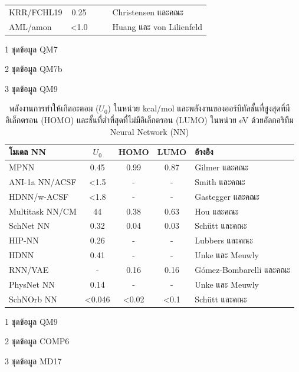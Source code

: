 \begin{table}[H]
\begin{threeparttable}[b]
\begin{tabular}{lcccl}
    KRR/FCHL19\tnote{3} &0.25 & & &Christensen และคณะ\autocite{christensen2020} \\
    AML/amon\tnote{3} &<1.0 & & &Huang และ von Lilienfeld\autocite{huang2020} \\
    \bottomrule
    \end{tabular}
    \begin{tablenotes}
        \item [1]ชุดข้อมูล QM7
        \item [2]ชุดข้อมูล QM7b
        \item [3]ชุดข้อมูล QM9
      \end{tablenotes}
    \end{threeparttable}
\end{table}

\begin{table}[H]
    \begin{threeparttable}[b]
    \centering
    \caption{พลังงานการทำให้เกิดอะตอม ($U_{0}$) ในหน่วย kcal/mol และพลังงานของออร์บิทัลชั้นที่สูงสุดที่มีอิเล็กตรอน (HOMO) 
    และชั้นที่ต่ำที่สุดที่ไม่มีอิเล็กตรอน (LUMO) ในหน่วย eV ด้วยอัลกอริทึม Neural Network (NN)}
    \label{tab:pred_ener_atom_orb_nn}
    \begin{tabular}{lcccl}
    \toprule
    \textbf{โมเดล NN} &\textbf{$U_{0}$} &HOMO &LUMO &\textbf{อ้างอิง} \\
    \midrule
    MPNN\tnote{1} &0.45 &0.99 &0.87 &Gilmer และคณะ\autocite{gilmer2017} \\
    ANI-1a NN/ACSF\tnote{2} &<1.5 &- &- &Smith และคณะ\autocite{smith2017,smith2018,smith2019} \\
    HDNN/w-ACSF\tnote{1} &<1.8 &- &- &Gastegger และคณะ\autocite{gastegger2018} \\
    Multitask NN/CM\tnote{1} &44 &0.38 &0.63 &Hou และคณะ\autocite{hou2018} \\
    SchNet NN\tnote{1} &0.32 &0.04 &0.03 &Schütt และคณะ\autocite{schutt2018} \\
    HIP-NN\tnote{1} &0.26 &- &- &Lubbers และคณะ\autocite{lubbers2018} \\
    HDNN\tnote{1} &0.41 &- &- &Unke และ Meuwly\autocite{unke2018} \\
    RNN/VAE\tnote{1} &- &0.16 &0.16 &G\'{o}mez-Bombarelli และคณะ\autocite{gomez-bombarelli2018} \\
    PhysNet NN\tnote{1} &0.14 &- &- &Unke และ Meuwly\autocite{unke2019} \\
    SchNOrb NN\tnote{3} &<0.046 &<0.02 &<0.1 &Sch\"{u}tt และคณะ\autocite{schutt2019a} \\
    \bottomrule
    \end{tabular}
    \begin{tablenotes}
        \item [1]ชุดข้อมูล QM9
        \item [2]ชุดข้อมูล COMP6
        \item [3]ชุดข้อมูล MD17
      \end{tablenotes}
    \end{threeparttable}
\end{table}

